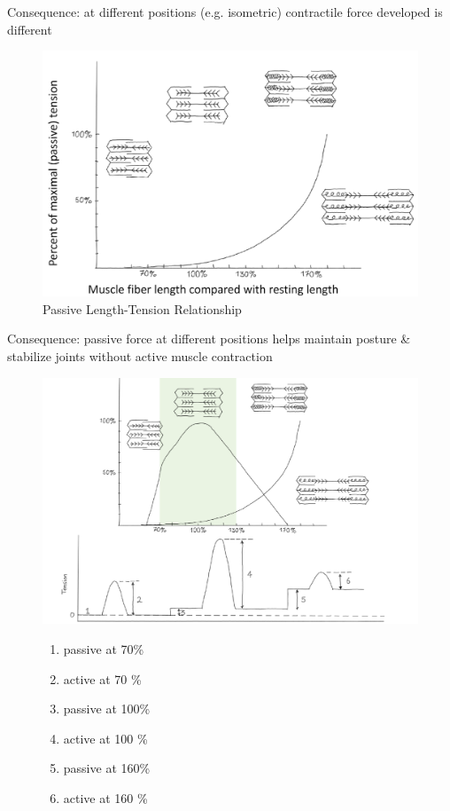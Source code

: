 \documentclass[11pt,fleqn]{book}
\begin{document}
\begin{remark}
    Consequence: at different
positions (e.g. isometric)
contractile force developed is
different
\end{remark}
\begin{figure}[h!]
\begin{center}
    \includegraphics[width=0.6\linewidth]{Pictures/Screenshot 2024-04-03 230713.png}
    \caption{Passive Length-Tension Relationship}
\end{center}
\end{figure}


\begin{remark}
    Consequence: passive force at
different positions helps maintain
posture \& stabilize joints without
active muscle contraction
\end{remark}
\begin{figure}[h!]
\begin{center}
    \includegraphics[width=0.85\linewidth]{Pictures/Screenshot 2024-04-03 230817.png}
\caption{ }
\begin{enumerate}
        \item passive at 70\%
        \item active at 70 \%
        \item passive at 100\%
        \item active at 100 \%
        \item passive at 160\%
        \item active at 160 \%
    \end{enumerate}
\end{center}
\end{figure}
\end{document}
